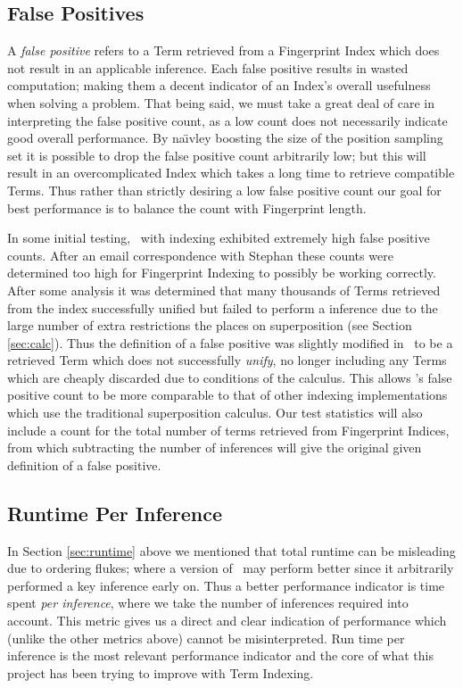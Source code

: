\subsection{False Positives}

A \emph{false positive} refers to a Term retrieved from a Fingerprint Index which does not
result in an applicable inference. Each false positive results in wasted computation;
making them a decent indicator of an Index's overall usefulness when solving a problem. That being said,
we must take a great deal of care in interpreting the false positive count, as
a low count does not necessarily indicate good overall performance. By na\"{\i}vley
boosting the size of the position sampling set it is possible to drop the false
positive count arbitrarily low; but this will result in an overcomplicated Index which
takes a long time to retrieve compatible Terms. Thus rather than strictly desiring a
low false positive count our goal for best performance is to balance the count with Fingerprint length.

In some initial testing, \beagle\ with indexing exhibited extremely high false positive
counts. After an email correspondence with Stephan  these counts were determined
too high for Fingerprint Indexing to possibly be working correctly. After some analysis
it was determined that many thousands of Terms retrieved from the index successfully unified but failed to
perform a inference due to the large number of extra restrictions the \HSWAC places
on superposition (see Section \ref{sec:calc}). Thus the definition of a false positive
was slightly modified in \beagle\ to be a retrieved Term which does not successfully
\emph{unify}, no longer including any Terms which are cheaply discarded due to conditions
of the calculus. This allows \beagle's false positive count to be more comparable
to that of other indexing implementations which use the traditional superposition calculus.
Our test statistics will also include a count for the total number of terms retrieved
from Fingerprint Indices, from which subtracting the number of inferences will
give the original given definition of a false positive.

\subsection{Runtime Per Inference}

In Section \ref{sec:runtime} above we mentioned that total runtime can be misleading
due to ordering flukes; where a version of \beagle\ may perform better since it
arbitrarily performed a key inference early on. Thus a better performance indicator
is time spent \emph{per inference}, where we take the number of inferences required into
account. This metric gives us a direct and clear indication of performance which
(unlike the other metrics above) cannot be misinterpreted. Run time per inference
is the most relevant performance indicator and the core of what this project
has been trying to improve with Term Indexing.

